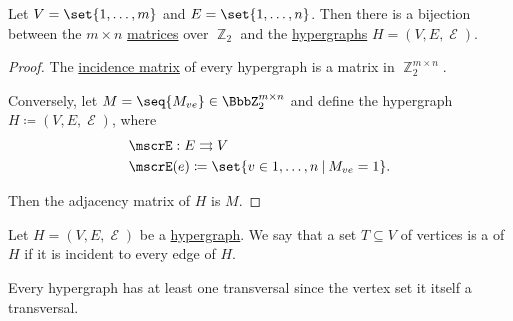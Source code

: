 \begin{proposition}\label{thm:graphs_as_linear_transformations}
  Let \( V = \set{ 1, \ldots, m } \) and \( E = \set{ 1, \ldots, n } \). Then there is a bijection between the \( m \times n \) \hyperref[def:array/matrix]{matrices} over \( \BbbZ_2 \) and the \hyperref[def:hypergraph]{hypergraphs} \( H = (V, E, \mscrE) \).
\end{proposition}
\begin{proof}
  The \hyperref[def:hypergraph_incidence_matrix]{incidence matrix} of every hypergraph is a matrix in \( \BbbZ_2^{m \times n} \).

  Conversely, let \( M = \seq{ M_{ve} } \in \BbbZ_2^{m \times n} \) and define the hypergraph \( H \coloneqq (V, E, \mscrE) \), where
  \begin{equation*}
    \begin{aligned}
      &\mscrE: E \multto V \\
      &\mscrE(e) \coloneqq \set{ v \in 1, \ldots, n \given M_{ve} = 1 }.
    \end{aligned}
  \end{equation*}

  Then the adjacency matrix of \( H \) is \( M \).
\end{proof}

\begin{definition}\label{def:hypergraph_transversal}
  Let \( H = (V, E, \mscrE) \) be a \hyperref[def:hypergraph]{hypergraph}. We say that a set \( T \subseteq V \) of vertices is a  of \( H \) if it is incident to every edge of \( H \).
\end{definition}

\begin{example}\label{ex:hypergraph_vertex_set_is_transversal}
  Every hypergraph has at least one transversal since the vertex set it itself a transversal.
\end{example}

